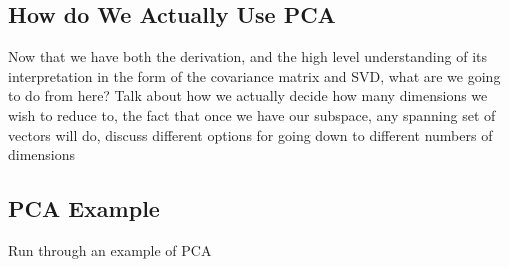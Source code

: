 \subsection{How do We Actually Use PCA}
Now that we have both the derivation, and the high level understanding of its interpretation in the form of the covariance matrix and SVD, what are we going to do from here? Talk about how we actually decide how many dimensions we wish to reduce to, the fact that once we have our subspace, any spanning set of vectors will do, discuss different options for going down to different numbers of dimensions

\subsection{PCA Example}
Run through an example of PCA
